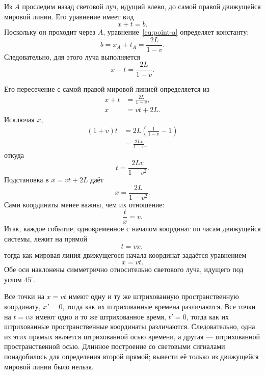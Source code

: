 Из \(A\) проследим назад световой луч, идущий влево, до самой правой движущейся мировой линии. Его уравнение имеет вид
\begin{equation}
x+t=b.
\end{equation}
Поскольку он проходит через \(A\), уравнение~\eqref{eq:point-a} определяет константу:
\begin{equation}
b=x_A+t_A=\frac{2L}{1-v}.
\end{equation}
Следовательно, для этого луча выполняется
\begin{equation}
x+t=\frac{2L}{1-v}.
\label{eq:backward-ray}
\end{equation}

Его пересечение с самой правой мировой линией определяется из
\begin{align}
x+t&=\frac{2L}{1-v},\\
x&=vt+2L.
\end{align}
Исключая \(x\),
\begin{align}
(1+v)t
  &=2L\left(\frac{1}{1-v}-1\right)\\
  &=\frac{2Lv}{1-v},
\end{align}
откуда
\begin{equation}
t=\frac{2Lv}{1-v^2}.
\end{equation}
Подстановка в \(x=vt+2L\) даёт
\begin{equation}
x=\frac{2L}{1-v^2}.
\end{equation}
Сами координаты менее важны, чем их отношение:
\begin{equation}
\frac{t}{x}=v.
\end{equation}
Итак, каждое событие, одновременное с началом координат по часам движущейся системы, лежит на прямой
\begin{equation}
t=vx,
\label{eq:simultaneity-c-one}
\end{equation}
тогда как мировая линия движущегося начала координат задаётся уравнением
\begin{equation}
x=vt.
\label{eq:moving-time-axis}
\end{equation}
Обе оси наклонены симметрично относительно светового луча, идущего под углом \(45^\circ\).

Все точки на \(x=vt\) имеют одну и ту же штрихованную пространственную координату, \(x'=0\), тогда как их штрихованные времена различаются. Все точки на \(t=vx\) имеют одно и то же штрихованное время, \(t'=0\), тогда как их штрихованные пространственные координаты различаются. Следовательно, одна из этих прямых является штрихованной осью времени, а другая — штрихованной пространственной осью. Длинное построение со световыми сигналами понадобилось для определения второй прямой; вывести её только из движущейся мировой линии было нельзя.


